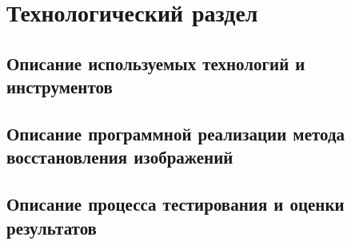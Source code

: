 \chapter{Технологический раздел}

\section{Описание используемых технологий и инструментов}

\section{Описание программной реализации метода восстановления изображений}

\section{Описание процесса тестирования и оценки результатов}